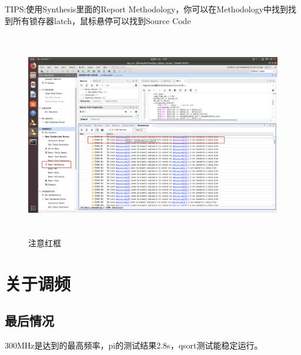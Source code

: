 \documentclass[a4paper,10pt,oneside]{article}
\begin{document}
TIPS:使用Synthesis里面的Report Methodology，你可以在Methodology中找到找到所有锁存器latch，鼠标悬停可以找到Source Code
\begin{figure}[H]
  \begin{center}
    \includegraphics[height=9cm]{latch.png}
  \end{center}
  \caption{注意红框}
\end{figure}

\section{关于调频}
\subsection{最后情况}
300MHz是达到的最高频率，pi的测试结果2.8s，qsort测试能稳定运行。
\end{document}
